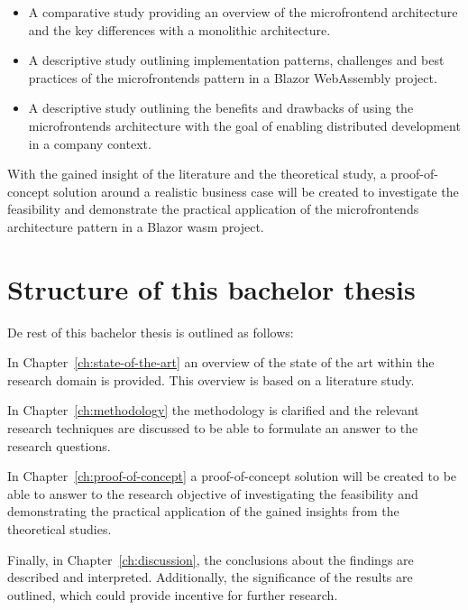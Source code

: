 \begin{itemize}
  \item A comparative study providing an overview of the microfrontend
  architecture and the key differences with a monolithic architecture.
  \item A descriptive study outlining implementation patterns, challenges and
  best practices of the microfrontends pattern in a Blazor WebAssembly project.
  \item A descriptive study outlining the benefits and drawbacks of using the
  microfrontends architecture with the goal of enabling distributed
  development in a company context.
\end{itemize}

With the gained insight of the literature and the theoretical study, a
proof-of-concept solution around a realistic business case will be created to
investigate the feasibility and demonstrate the practical application of the
microfrontends architecture pattern in a Blazor \gls{wasm} project. 


\section{Structure of this bachelor thesis}
\label{sec:structure}


De rest of this bachelor thesis is outlined as follows:

In Chapter~\ref{ch:state-of-the-art} an overview of the state of the art within
the research domain is provided. This overview is based on a literature study.

In Chapter~\ref{ch:methodology} the methodology is clarified and the relevant
research techniques are discussed to be able to formulate an answer to the
research questions.

In Chapter~\ref{ch:proof-of-concept} a proof-of-concept solution will be created
to be able to answer to the research objective of investigating the feasibility
and demonstrating the practical application of the gained insights from the
theoretical studies. 

Finally, in Chapter~\ref{ch:discussion}, the conclusions about the findings are
described and interpreted. Additionally, the significance of the results are
outlined, which could provide incentive for further research.